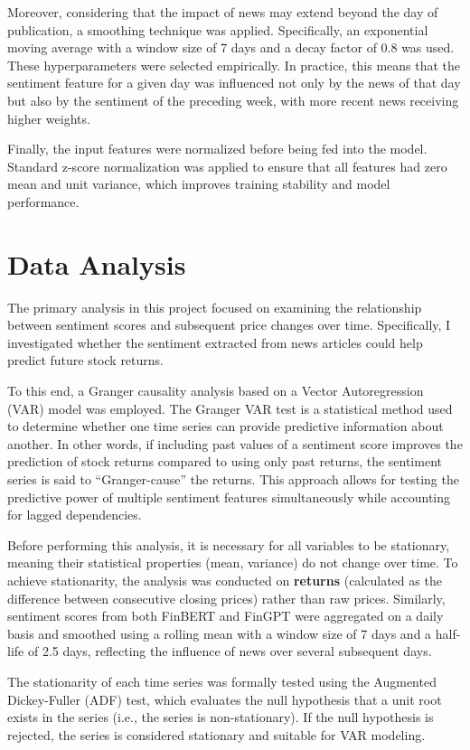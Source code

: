 \documentclass[12pt,a4paper]{report}
\begin{document}
Moreover, considering that the impact of news may extend beyond the day of publication, a smoothing technique was applied. Specifically, an exponential moving average with a window size of 7 days and a decay factor of 0.8 was used. These hyperparameters were selected empirically. In practice, this means that the sentiment feature for a given day was influenced not only by the news of that day but also by the sentiment of the preceding week, with more recent news receiving higher weights.  

Finally, the input features were normalized before being fed into the model. Standard z-score normalization was applied to ensure that all features had zero mean and unit variance, which improves training stability and model performance.

\section{Data Analysis}

The primary analysis in this project focused on examining the relationship between sentiment scores and subsequent price changes over time. Specifically, I investigated whether the sentiment extracted from news articles could help predict future stock returns.

To this end, a Granger causality analysis based on a Vector Autoregression (VAR) model was employed. The Granger VAR test is a statistical method used to determine whether one time series can provide predictive information about another. In other words, if including past values of a sentiment score improves the prediction of stock returns compared to using only past returns, the sentiment series is said to ``Granger-cause'' the returns. This approach allows for testing the predictive power of multiple sentiment features simultaneously while accounting for lagged dependencies.

Before performing this analysis, it is necessary for all variables to be stationary, meaning their statistical properties (mean, variance) do not change over time. To achieve stationarity, the analysis was conducted on \textbf{returns} (calculated as the difference between consecutive closing prices) rather than raw prices. Similarly, sentiment scores from both FinBERT and FinGPT were aggregated on a daily basis and smoothed using a rolling mean with a window size of 7 days and a half-life of 2.5 days, reflecting the influence of news over several subsequent days.

The stationarity of each time series was formally tested using the Augmented Dickey-Fuller (ADF) test, which evaluates the null hypothesis that a unit root exists in the series (i.e., the series is non-stationary). If the null hypothesis is rejected, the series is considered stationary and suitable for VAR modeling.  
\end{document}
